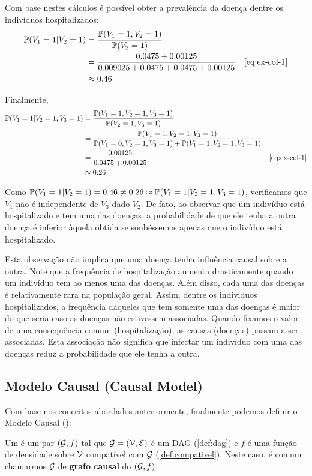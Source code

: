 Com base nestes cálculos é possível obter
a prevalência da doença dentre os indivíduos hospitalizados:
\begin{align*}
 \P(V_1=1|V_2=1) 
 &= \frac{\P(V_1=1,V_2=1)}{\P(V_2=1)} \\
 &= \frac{0.0475 + 0.00125}{0.009025 + 0.0475 + 0.0475 + 0.00125} 
 & \text{\cref{eq:ex-col-1}} \\
 &\approx 0.46
\end{align*}

Finalmente,
\begin{align*}
 \P(V_1 = 1|V_2 = 1, V_3 = 1)
 &= \frac{\P(V_1=1,V_2=1,V_3=1)}{\P(V_2=1,V_3=1)} \\
 &= \frac{\P(V_1=1,V_2=1,V_3=1)}
 {\P(V_1=0,V_2=1,V_3=1) + \P(V_1=1,V_2=1,V_3=1)} \\
 &= \frac{0.00125}{0.0475 + 0.00125} & \text{\cref{eq:ex-col-1}} \\
 &\approx 0.26 
\end{align*}

Como $\P(V_1=1|V_2=1) = 0.46 \neq 0.26 \approx \P(V_1=1|V_2=1,V_3=1)$,
verificamos que $V_1$ não é independente de $V_3$ dado $V_2$.
De fato, ao observar que um indivíduo está hospitalizado e
tem uma das doenças, a probabilidade de que ele tenha
a outra doença é inferior àquela obtida se soubéssemos apenas
que o indivíduo está hospitalizado.

Esta observação 
não implica que uma doença tenha influência causal sobre a outra.
Note que a frequência de hospitalização aumenta 
drasticamente quando um indivíduo tem ao menos uma das doenças.
Além disso, cada uma das doenças é relativamente rara na população geral.
Assim, dentre os indíviduos hospitalizados,
a frequência daqueles que tem somente uma das doenças é
maior do que seria caso as doenças não estivessem associadas.
Quando fixamos o valor de uma consequência comum (hospitalização),
as causas (doenças) passam a ser associadas.
Esta associação não significa que
infectar um indivíduo com uma das doenças
reduz a probabilidade que ele tenha a outra.

\subsection{Modelo Causal (Causal Model)}
\label{sec:cm}

Com base nos conceitos abordados anteriormente,
finalmente podemos definir
o Modelo Causal (\CM):

\begin{definition}
 \label{def:cm}
 Um \CM é um par $(\sG,f)$ tal que
 $\sG = (\sV, \sE)$ é um DAG (\cref{def:dag}) e
 $f$ é uma função de densidade sobre $\sV$
 compatível com $\sG$ (\cref{def:compativel}).
 Neste caso, é comum chamarmos $\sG$ de
 \textbf{grafo causal} do \CM $(\sG,f)$.
\end{definition}

